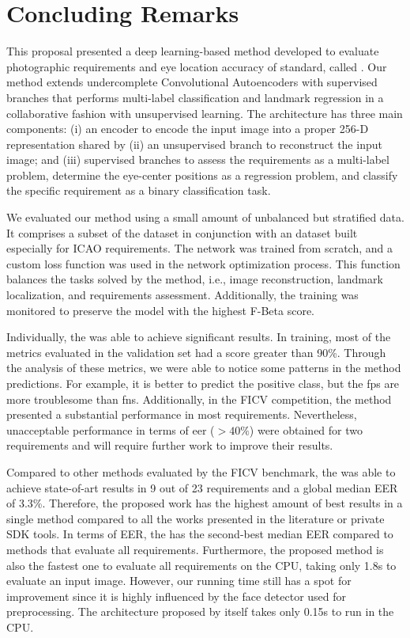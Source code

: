 \section{Concluding Remarks}

This proposal presented a deep learning-based method developed to evaluate photographic requirements and eye location accuracy of \icao standard, called \methodname. Our method extends undercomplete Convolutional Autoencoders with supervised branches that performs multi-label classification and landmark regression in a collaborative fashion with unsupervised learning. The architecture has three main components: (i) an encoder to encode the input image into a proper 256-D representation shared by (ii) an unsupervised branch to reconstruct the input image; and (iii) supervised branches to assess the requirements as a multi-label problem, determine the eye-center positions as a regression problem, and classify the specific \pixelation requirement as a binary classification task.

We evaluated our method using a small amount of unbalanced but stratified data. It comprises a subset of the \ficvtest dataset in conjunction with an \adhoc dataset built especially for ICAO requirements. The network was trained from scratch, and a custom loss function was used in the network optimization process. This function balances the tasks solved by the method, i.e., image reconstruction, landmark localization, and requirements assessment. Additionally, the training was monitored to preserve the model with the highest F-Beta score.

Individually, the \methodname was able to achieve significant results. In training, most of the metrics evaluated in the validation set had a score greater than 90\%. Through the analysis of these metrics, we were able to notice some patterns in the method predictions. For example, it is better to predict the positive class, but the \aclp{fp} are more troublesome than \aclp{fn}. Additionally, in the FICV competition, the method presented a substantial performance in most requirements. Nevertheless, unacceptable performance in terms of \acs{eer} ($> 40\%$) were obtained for two requirements and will require further work to improve their results.

Compared to other methods evaluated by the FICV benchmark, the \methodname was able to achieve state-of-art results in 9 out of 23 requirements and a global median EER of 3.3\%. Therefore, the proposed work has the highest amount of best results in a single method compared to all the works presented in the literature or private SDK tools. In terms of EER, the \methodname has the second-best median EER compared to methods that evaluate all requirements. Furthermore, the proposed method is also the fastest one to evaluate all requirements on the CPU, taking only 1.8s to evaluate an input image. However, our running time still has a spot for improvement since it is highly influenced by the face detector used for preprocessing. The architecture proposed by itself takes only 0.15s to run in the CPU.

